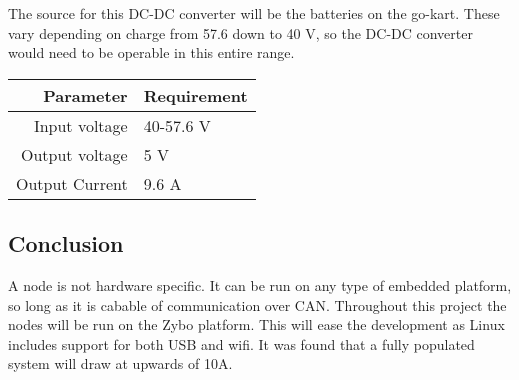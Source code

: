The source for this DC-DC converter will be the batteries on the go-kart. 
These vary depending on charge from 57.6 down to 40 V, so the DC-DC converter would need to be operable in this entire range.


\begin{table}[H]
	\centering
	\begin{tabular}{r|l}
		Parameter & Requirement  \\
		\hline
		Input voltage & 40-57.6 V\\
		Output voltage & 5 V\\
		Output Current & 9.6 A
	\end{tabular}
\end{table}


\subsection{Conclusion}
A node is not hardware specific. 
It can be run on any type of embedded platform, so long as it is cabable of communication over CAN.
Throughout this project the nodes will be run on the Zybo platform.
This will ease the development as Linux includes support for both USB and wifi.
It was found that a fully populated system will draw at upwards of 10\si{\ampere}.

